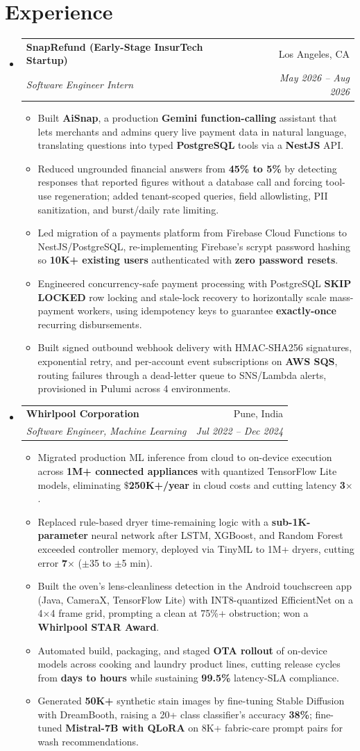 \documentclass[letterpaper,10pt]{article}
\makeatletter
\newcommand{\entry}[4]{\item[]\begin{tabular*}{\linewidth}[t]{l@{\extracolsep{\fill}}r}\textbf{#1} & #2\\ \textit{\small#3} & \textit{\small#4}\\\end{tabular*}\vspace{-6pt}}
\newcommand{\pt}[1]{\item\small{#1\vspace{-2.5pt}}}
\newcommand{\listS}{\begin{itemize}[leftmargin=0.15in,label={}]}
\newcommand{\listE}{\end{itemize}}
\newcommand{\bS}{\begin{itemize}[leftmargin=0.18in,label={-}]}
\newcommand{\bE}{\end{itemize}\vspace{-4pt}}
\makeatother
\begin{document}
\section{Experience}
\listS
\entry{SnapRefund (Early-Stage InsurTech Startup)}{Los Angeles, CA}{Software Engineer Intern}{May 2026 -- Aug 2026}
\bS
\pt{Built \textbf{AiSnap}, a production \textbf{Gemini function-calling} assistant that lets merchants and admins query live payment data in natural language, translating questions into typed \textbf{PostgreSQL} tools via a \textbf{NestJS} API.}
\pt{Reduced ungrounded financial answers from \textbf{45\% to 5\%} by detecting responses that reported figures without a database call and forcing tool-use regeneration; added tenant-scoped queries, field allowlisting, PII sanitization, and burst/daily rate limiting.}
\pt{Led migration of a payments platform from Firebase Cloud Functions to NestJS/PostgreSQL, re-implementing Firebase's scrypt password hashing so \textbf{10K+ existing users} authenticated with \textbf{zero password resets}.}
\pt{Engineered concurrency-safe payment processing with PostgreSQL \textbf{SKIP LOCKED} row locking and stale-lock recovery to horizontally scale mass-payment workers, using idempotency keys to guarantee \textbf{exactly-once} recurring disbursements.}
\pt{Built signed outbound webhook delivery with HMAC-SHA256 signatures, exponential retry, and per-account event subscriptions on \textbf{AWS SQS}, routing failures through a dead-letter queue to SNS/Lambda alerts, provisioned in Pulumi across 4 environments.}
\bE
\entry{Whirlpool Corporation}{Pune, India}{Software Engineer, Machine Learning}{Jul 2022 -- Dec 2024}
\bS
\pt{Migrated production ML inference from cloud to on-device execution across \textbf{1M+ connected appliances} with quantized TensorFlow Lite models, eliminating \textbf{$\mathdollar$250K+/year} in cloud costs and cutting latency \textbf{3$\times$}.}
\pt{Replaced rule-based dryer time-remaining logic with a \textbf{sub-1K-parameter} neural network after LSTM, XGBoost, and Random Forest exceeded controller memory, deployed via TinyML to 1M+ dryers, cutting error \textbf{7$\times$} ($\pm$35 to $\pm$5 min).}
\pt{Built the oven's lens-cleanliness detection in the Android touchscreen app (Java, CameraX, TensorFlow Lite) with INT8-quantized EfficientNet on a 4$\times$4 frame grid, prompting a clean at 75\%+ obstruction; won a \textbf{Whirlpool STAR Award}.}
\pt{Automated build, packaging, and staged \textbf{OTA rollout} of on-device models across cooking and laundry product lines, cutting release cycles from \textbf{days to hours} while sustaining \textbf{99.5\%} latency-SLA compliance.}
\pt{Generated \textbf{50K+} synthetic stain images by fine-tuning Stable Diffusion with DreamBooth, raising a 20+ class classifier's accuracy \textbf{38\%}; fine-tuned \textbf{Mistral-7B with QLoRA} on 8K+ fabric-care prompt pairs for wash recommendations.}
\bE
\listE
\end{document}
